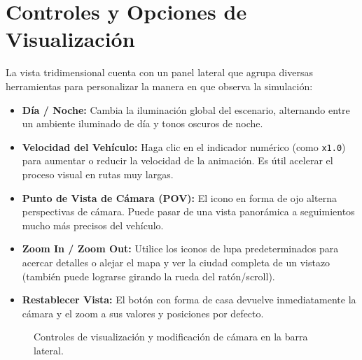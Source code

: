 \documentclass[12pt]{article}
\begin{document}
\section{Controles y Opciones de Visualización}
La vista tridimensional cuenta con un panel lateral que agrupa diversas herramientas para personalizar la manera en que observa la simulación:
\begin{itemize}
    \item \textbf{Día / Noche:} Cambia la iluminación global del escenario, alternando entre un ambiente iluminado de día y tonos oscuros de noche.
    \item \textbf{Velocidad del Vehículo:} Haga clic en el indicador numérico (como \texttt{x1.0}) para aumentar o reducir la velocidad de la animación. Es útil acelerar el proceso visual en rutas muy largas.
    \item \textbf{Punto de Vista de Cámara (POV):} El icono en forma de ojo alterna perspectivas de cámara. Puede pasar de una vista panorámica a seguimientos mucho más precisos del vehículo.
    \item \textbf{Zoom In / Zoom Out:} Utilice los iconos de lupa predeterminados para acercar detalles o alejar el mapa y ver la ciudad completa de un vistazo (también puede lograrse girando la rueda del ratón/scroll).
    \item \textbf{Restablecer Vista:} El botón con forma de casa devuelve inmediatamente la cámara y el zoom a sus valores y posiciones por defecto.
\end{itemize}

\begin{figure}[h!]
    \centering
    \vspace{6cm} %
    \caption{Controles de visualización y modificación de cámara en la barra lateral.}
\end{figure}
\end{document}
